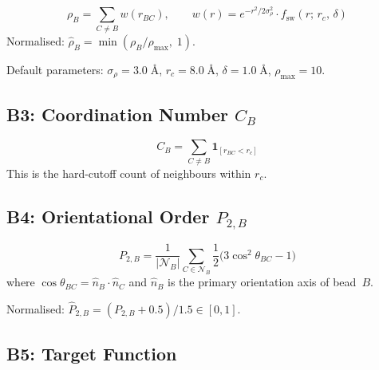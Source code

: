 \documentclass[11pt, a4paper, oneside]{article}
\newcommand{\Ang}{\text{\AA}}
\begin{document}
\begin{equation}
  \rho_B = \sum_{C \neq B} w(r_{BC}), \qquad
  w(r) = e^{-r^2 / 2\sigma_\rho^2} \cdot f_{\text{sw}}(r;\, r_c,\, \delta)
  \label{eq:density}
\end{equation}
%
Normalised: $\hat{\rho}_B = \min(\rho_B / \rho_{\max},\; 1)$.

Default parameters: $\sigma_\rho = 3.0\;\Ang$,\; $r_c = 8.0\;\Ang$,\;
$\delta = 1.0\;\Ang$,\; $\rho_{\max} = 10$.

\subsection{B3: Coordination Number \texorpdfstring{$C_B$}{CB}}
\label{sec:b3-coordination}

\begin{equation}
  C_B = \sum_{C \neq B} \mathbf{1}_{[r_{BC} < r_c]}
  \label{eq:coordination}
\end{equation}
%
This is the hard-cutoff count of neighbours within $r_c$.

\subsection{B4: Orientational Order \texorpdfstring{$P_{2,B}$}{P2B}}
\label{sec:b4-orientation}

\begin{equation}
  P_{2,B} = \frac{1}{|\mathcal{N}_B|}
    \sum_{C \in \mathcal{N}_B}
    \frac{1}{2}\bigl(3\cos^2\theta_{BC} - 1\bigr)
  \label{eq:P2}
\end{equation}
%
where $\cos\theta_{BC} = \hat{n}_B \cdot \hat{n}_C$ and $\hat{n}_B$
is the primary orientation axis of bead~$B$.

Normalised: $\hat{P}_{2,B} = (P_{2,B} + 0.5) / 1.5 \in [0, 1]$.

\newpage
\subsection{B5: Target Function}
\label{sec:b5-target}
\end{document}
